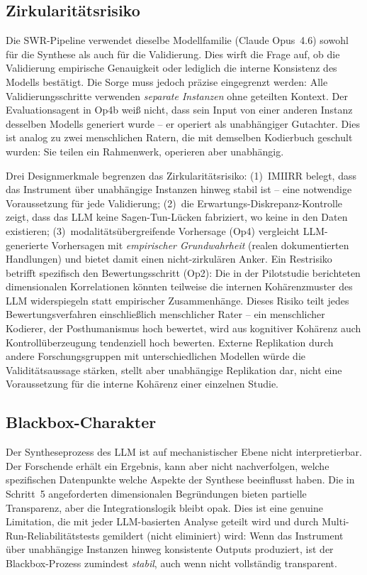 \documentclass[11pt,a4paper]{article}
\begin{document}
\subsection{Zirkularit\"atsrisiko}
\label{sec:limitations:circularity}

Die SWR-Pipeline verwendet dieselbe Modellfamilie (Claude Opus~4.6) sowohl f\"ur die Synthese als auch f\"ur die Validierung. Dies wirft die Frage auf, ob die Validierung empirische Genauigkeit oder lediglich die interne Konsistenz des Modells best\"atigt. Die Sorge muss jedoch pr\"azise eingegrenzt werden: Alle Validierungsschritte verwenden \emph{separate Instanzen} ohne geteilten Kontext. Der Evaluationsagent in Op4b wei\ss{} nicht, dass sein Input von einer anderen Instanz desselben Modells generiert wurde -- er operiert als unabh\"angiger Gutachter. Dies ist analog zu zwei menschlichen Ratern, die mit demselben Kodierbuch geschult wurden: Sie teilen ein Rahmenwerk, operieren aber unabh\"angig.

Drei Designmerkmale begrenzen das Zirkularit\"atsrisiko: (1)~IMIIRR belegt, dass das Instrument \"uber unabh\"angige Instanzen hinweg stabil ist -- eine notwendige Voraussetzung f\"ur jede Validierung; (2)~die Erwartungs-Diskrepanz-Kontrolle zeigt, dass das LLM keine Sagen-Tun-L\"ucken fabriziert, wo keine in den Daten existieren; (3)~modalit\"ats\"ubergreifende Vorhersage (Op4) vergleicht LLM-generierte Vorhersagen mit \emph{empirischer Grundwahrheit} (realen dokumentierten Handlungen) und bietet damit einen nicht-zirkul\"aren Anker. Ein Restrisiko betrifft spezifisch den Bewertungsschritt (Op2): Die in der Pilotstudie berichteten dimensionalen Korrelationen k\"onnten teilweise die internen Koh\"arenzmuster des LLM widerspiegeln statt empirischer Zusammenh\"ange. Dieses Risiko teilt jedes Bewertungsverfahren einschlie\ss{}lich menschlicher Rater -- ein menschlicher Kodierer, der Posthumanismus hoch bewertet, wird aus kognitiver Koh\"arenz auch Kontroll\"uberzeugung tendenziell hoch bewerten. Externe Replikation durch andere Forschungsgruppen mit unterschiedlichen Modellen w\"urde die Validit\"atsaussage st\"arken, stellt aber unabh\"angige Replikation dar, nicht eine Voraussetzung f\"ur die interne Koh\"arenz einer einzelnen Studie.


\subsection{Blackbox-Charakter}
\label{sec:limitations:blackbox}

Der Syntheseprozess des LLM ist auf mechanistischer Ebene nicht interpretierbar. Der Forschende erh\"alt ein Ergebnis, kann aber nicht nachverfolgen, welche spezifischen Datenpunkte welche Aspekte der Synthese beeinflusst haben. Die in Schritt~5 angeforderten dimensionalen Begr\"undungen bieten partielle Transparenz, aber die Integrationslogik bleibt opak. Dies ist eine genuine Limitation, die mit jeder LLM-basierten Analyse geteilt wird und durch Multi-Run-Reliabilit\"atstests gemildert (nicht eliminiert) wird: Wenn das Instrument \"uber unabh\"angige Instanzen hinweg konsistente Outputs produziert, ist der Blackbox-Prozess zumindest \emph{stabil}, auch wenn nicht vollst\"andig transparent.
\end{document}
